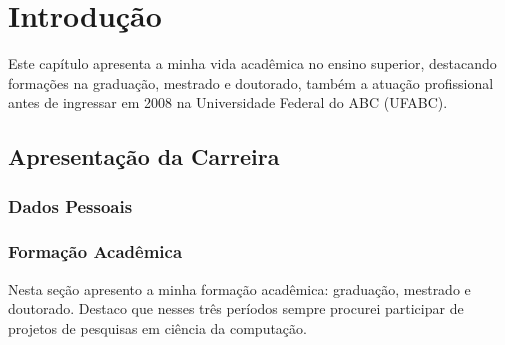
\chapter[Introdução]{Introdução}\label{cap:introducao}

Este capítulo apresenta a minha vida acadêmica no ensino superior, destacando formações na graduação, mestrado e doutorado, também a atuação profissional antes de ingressar em 2008 na Universidade Federal do ABC (UFABC).

\section{Apresentação da Carreira}

\subsection{Dados Pessoais}

\setlength{\fboxsep}{10pt}
\setlength{\fboxrule}{2pt}

\subsection{Formação Acadêmica}

Nesta seção apresento a minha formação acadêmica: graduação, mestrado e doutorado. Destaco que nesses três períodos sempre procurei participar de projetos de pesquisas em ciência da computação.

